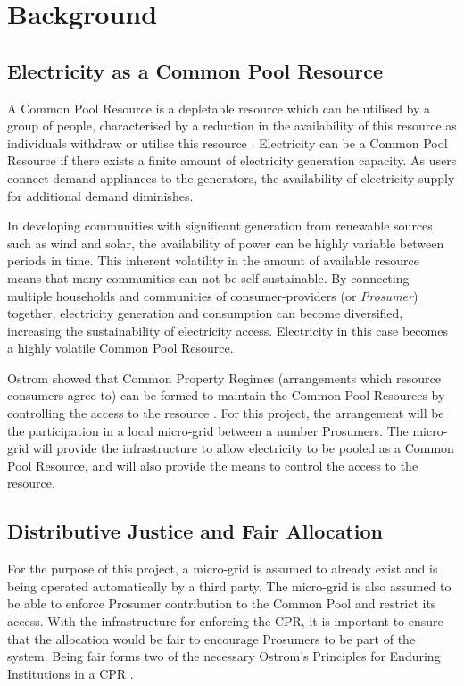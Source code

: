 \chapter{Background}
\label{Background}

\section*{Electricity as a Common Pool Resource}
A Common Pool Resource is a depletable resource which can be utilised by a group of people, characterised by a reduction in the availability of this resource as individuals withdraw or utilise this resource \cite{Ostrom:90}.  Electricity can be a Common Pool Resource if there exists a finite amount of electricity generation capacity. As users connect demand appliances to the generators, the availability of electricity supply for additional demand diminishes.

In developing communities with significant generation from renewable sources such as wind and solar, the availability of power can be highly variable between periods in time. This inherent volatility in the amount of available resource means that many communities can not be self-sustainable. By connecting multiple households and communities of consumer-providers (or \textit{Prosumer}) together, electricity generation and consumption can become diversified, increasing the sustainability of electricity access. Electricity in this case becomes a highly volatile Common Pool Resource.

Ostrom showed that Common Property Regimes (arrangements which resource consumers agree to) can be formed to maintain the Common Pool Resources by controlling the access to the resource \cite{Ostrom:90}. For this project, the arrangement will be the participation in a local micro-grid between a number Prosumers. The micro-grid will provide the infrastructure to allow electricity to be pooled as a Common Pool Resource, and will also provide the means to control the access to the resource.

\section*{Distributive Justice and Fair Allocation}
For the purpose of this project, a micro-grid is assumed to already exist and is being operated automatically by a third party. The micro-grid is also assumed to be able to enforce Prosumer contribution to the Common Pool and restrict its access. With the infrastructure for enforcing the \ac{CPR}, it is important to ensure that the allocation would be fair to encourage Prosumers to be part of the system. Being fair forms two of the necessary Ostrom's Principles for Enduring Institutions in a CPR \cite{Ostrom:90}. \\

